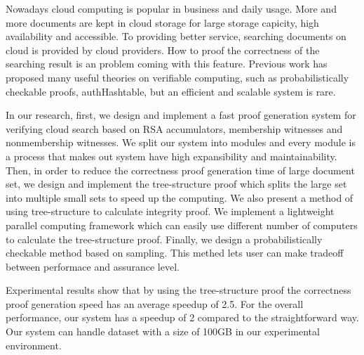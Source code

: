 \begin{englishabstract}

	Nowadays cloud computing is popular in business and daily usage. 
	More and more documents are kept in cloud storage for large storage capicity, high availability and accessible. 
	To providing better service, searching documents on cloud is provided by cloud providers.
	How to proof the correctness of the searching result is an problem coming with this feature.
	Previous work has proposed many useful theories on verifiable computing, such as probabilistically checkable proofs, authHashtable, but an efficient and scalable system is rare.

	In our research, first, we design and implement a fast proof generation system for verifying cloud search based on RSA accumulators, membership witnesses and nonmembership witnesses. We split our system into modules and every module is a process that makes out system have high expansibility and maintainability. 
	Then, in order to reduce the correctness proof generation time of large document set, we design and implement the tree-structure proof which splits the large set into multiple small sets to speed up the computing. We also present a method of using tree-structure to calculate integrity proof.
	We implement a lightweight parallel computing framework which can easily use different number of computers to calculate the tree-structure proof.
	Finally, we design a probabilistically checkable method based on sampling. This methed lets user can make tradeoff between performace and assurance level.

    Experimental results show that by using the tree-structure proof the correctness proof generation speed has an average speedup of 2.5. For the overall performance, our system has a speedup of 2 compared to the straightforward way. Our system can handle dataset with a size of 100GB in our experimental environment.

\end{englishabstract}
